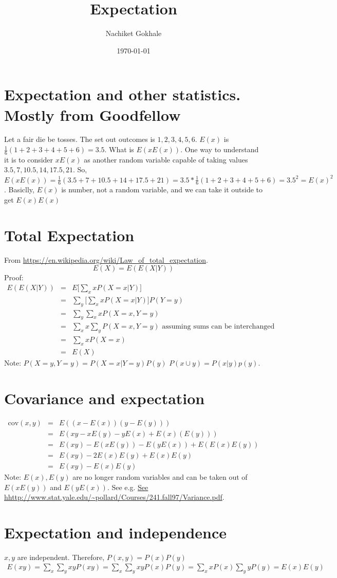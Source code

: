 \documentclass{article}
\newcommand{\beq}{\begin{equation}}
\newcommand{\eeq}{\end{equation}}
\newcommand{\ber}{\begin{eqnarray}}
\newcommand{\eer}{\end{eqnarray}}
\begin{document}
\title{Expectation}
\author{Nachiket Gokhale}
\date{\today}
\maketitle
%
%
%
\section{Expectation and other statistics. Mostly from Goodfellow}
Let a fair die be tosses. The set out outcomes is ${1,2,3,4,5,6}$. $E(x)$ is $\frac{1}{6}(1+2+3+4+5+6)=3.5$. What is $E(xE(x))$. One way to understand it is to consider $xE(x)$ as another random variable capable of taking values ${3.5,7,10.5,14,17.5,21}$. So, $E(xE(x))=\frac{1}{6}(3.5+7+10.5+14+17.5+21)=3.5*\frac{1}{6}(1+2+3+4+5+6)=3.5^2=E(x)^2$. Basiclly, $E(x)$ is number, not a random variable, and we can take it outside to get $E(x)E(x)$
%
%
%
\section{Total Expectation}
From \url{https://en.wikipedia.org/wiki/Law_of_total_expectation}.
\beq
E(X) = E(E(X|Y))
\eeq
Proof:
\ber
E(E(X|Y)) &=& E\Big[\sum_{x}xP(X=x|Y)\Big] \\
&=& \sum_y\Big[\sum_{x}xP(X=x|Y)\Big]P(Y=y) \\
&=& \sum_y\sum_xxP(X=x,Y=y) \\
&=& \sum_x x \sum_yP(X=x,Y=y) \text{ assuming sums can be interchanged } \\
&=& \sum_x x P(X=x) \\
&=& E(X)
\eer
Note: $P(X=y,Y=y)=P(X=x|Y=y)P(y)$  $P(x\cup{y}) = P(x|y)p(y)$.
%
%
%
\section{Covariance and expectation}
\ber
\text{cov}(x,y) &=& E((x-E(x))(y-E(y))) \\
&=& E(xy - xE(y) - yE(x) + E(x)(E(y))) \\
&=& E(xy)- E(xE(y)) - E(yE(x)) + E(E(x)E(y)) \\
&=& E(xy) -2E(x)E(y) + E(x)E(y) \\
&=& E(xy) - E(x)E(y)
\eer
Note: $E(x),E(y)$ are no longer random variables and can be taken out of $E(xE(y))$ and $E(yE(x))$. See e.g. \url{See hhttp://www.stat.yale.edu/~pollard/Courses/241.fall97/Variance.pdf}.
\section{Expectation and independence}
$x,y$ are independent. Therefore, $P(x,y)=P(x)P(y)$
\ber
E(xy) = \sum_{x}\sum_y xy P(xy) =  \sum_{x}\sum_y xy P(x)P(y) = \sum_x xP(x) \sum_y yP(y) = E(x)E(y)
\eer
\end{document}
